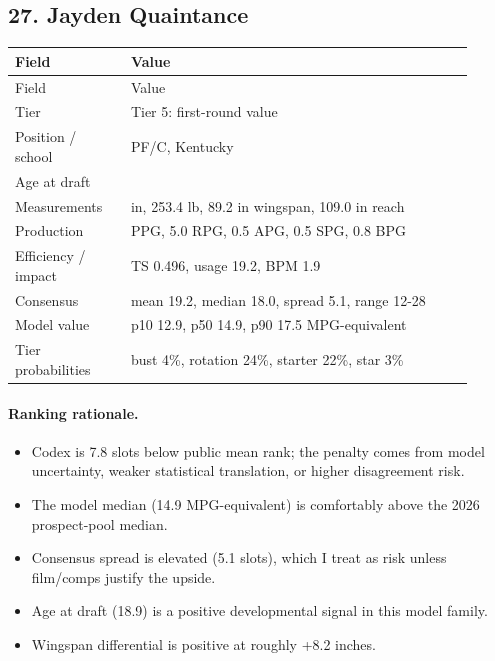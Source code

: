 \documentclass[11pt]{article}
\begin{document}
\subsection{27. Jayden Quaintance}
\begin{center}
\scriptsize
\begin{longtable}{@{}>{\raggedright\arraybackslash}p{0.230\linewidth}>{\raggedright\arraybackslash}p{0.680\linewidth}@{}}
\toprule
Field & Value \\
\midrule
\endfirsthead
\toprule
Field & Value \\
\midrule
\endhead
Tier & Tier 5: first-round value \\
Position / school & PF/C, Kentucky \\
Age at draft & 18.9 \\
Measurements & 81.0 in, 253.4 lb, 89.2 in wingspan, 109.0 in reach \\
Production & 5.0 PPG, 5.0 RPG, 0.5 APG, 0.5 SPG, 0.8 BPG \\
Efficiency / impact & TS 0.496, usage 19.2, BPM 1.9 \\
Consensus & mean 19.2, median 18.0, spread 5.1, range 12-28 \\
Model value & p10 12.9, p50 14.9, p90 17.5 MPG-equivalent \\
Tier probabilities & bust 4\%, rotation 24\%, starter 22\%, star 3\% \\
\bottomrule
\end{longtable}
\end{center}

\paragraph{Ranking rationale.}
\begin{itemize}[leftmargin=*]
\item Codex is 7.8 slots below public mean rank; the penalty comes from model uncertainty, weaker statistical translation, or higher disagreement risk.
\item The model median (14.9 MPG-equivalent) is comfortably above the 2026 prospect-pool median.
\item Consensus spread is elevated (5.1 slots), which I treat as risk unless film/comps justify the upside.
\item Age at draft (18.9) is a positive developmental signal in this model family.
\item Wingspan differential is positive at roughly +8.2 inches.
\end{itemize}
\end{document}
